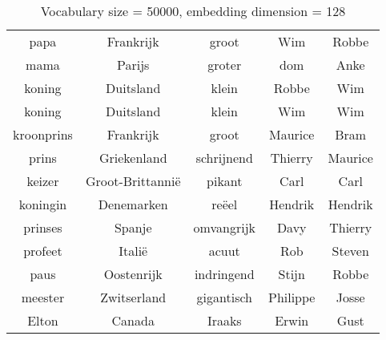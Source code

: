 \begin{table}[H]
\centering
\caption[Vocabulary size = 50000, embedding dimension = 128]{Vocabulary size = 50000, embedding dimension = 128}
\label{tab:emb_experiments_relations}
\begin{tabular}{|c|c|c|c|c|}
\hline
papa & Frankrijk & groot & Wim & Robbe \\
mama & Parijs & groter & dom & Anke \\
koning & Duitsland & klein & Robbe & Wim \\ \hline \hline
koning & Duitsland & klein & Wim & Wim\\
kroonprins & Frankrijk & groot & Maurice & Bram\\
prins & Griekenland & schrijnend & Thierry & Maurice\\
keizer & Groot-Brittannië & pikant & Carl & Carl\\
koningin & Denemarken & reëel & Hendrik & Hendrik\\
prinses & Spanje & omvangrijk & Davy & Thierry\\
profeet & Italië & acuut & Rob & Steven\\
paus & Oostenrijk & indringend & Stijn & Robbe\\
meester & Zwitserland & gigantisch & Philippe & Josse\\
Elton & Canada & Iraaks & Erwin & Gust\\
\hline
\end{tabular}
\end{table}
